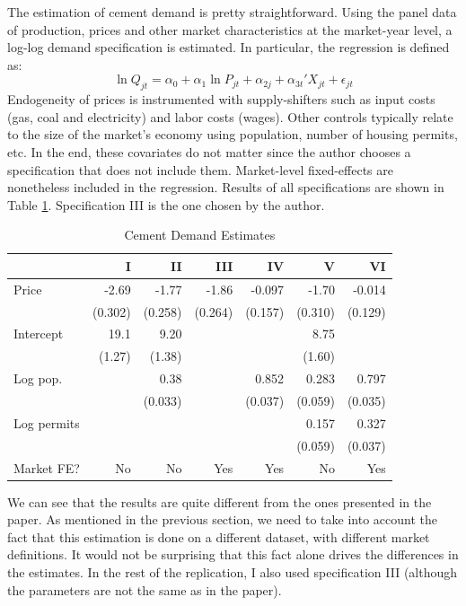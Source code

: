 \documentclass[12pt]{article}
\begin{document}
The estimation of cement demand is pretty straightforward. Using the panel data of production, prices and other market characteristics at the market-year level, a log-log demand specification is estimated. In particular, the regression is defined as: $$\ln Q_{jt} = \alpha_0 + \alpha_1\ln P_{jt} + \alpha_{2j} + \alpha_{3t}'X_{jt} + \epsilon_{jt} $$
Endogeneity of prices is instrumented with supply-shifters such as input costs (gas, coal and electricity) and labor costs (wages). Other controls typically relate to the size of the market's economy using population, number of housing permits, etc. In the end, these covariates do not matter since the author chooses a specification that does not include them. Market-level fixed-effects are nonetheless included in the regression. Results of all specifications are shown in Table \ref{tab:demand}. Specification III is the one chosen by the author.

\begin{table}[ht!]
\centering
\begin{tabular}{lrrrrrr}
\hline \hline
 & I & II & III & IV & V & VI \\ \hline
Price & -2.69 & -1.77 & -1.86 & -0.097 & -1.70 & -0.014 \\
 & (0.302) & (0.258) & (0.264) & (0.157) & (0.310) & (0.129) \\
Intercept & 19.1 & 9.20 &  &  & 8.75 &  \\
 & (1.27) & (1.38) &  &  & (1.60) &  \\
Log pop. &  & 0.38 &  & 0.852 & 0.283 & 0.797 \\
 &  & (0.033) &  & (0.037) & (0.059) & (0.035) \\
Log permits &  &  &  &  & 0.157 & 0.327 \\
 &  &  &  &  & (0.059) & (0.037) \\
Market FE? & No & No & Yes & Yes & No & Yes \\ \hline \hline
\end{tabular}
\caption{Cement Demand Estimates}
\label{tab:demand}
\end{table}

We can see that the results are quite different from the ones presented in the paper. As mentioned in the previous section, we need to take into account the fact that this estimation is done on a different dataset, with different market definitions. It would not be surprising that this fact alone drives the differences in the estimates. In the rest of the replication, I also used specification III (although the parameters are not the same as in the paper).
\end{document}
